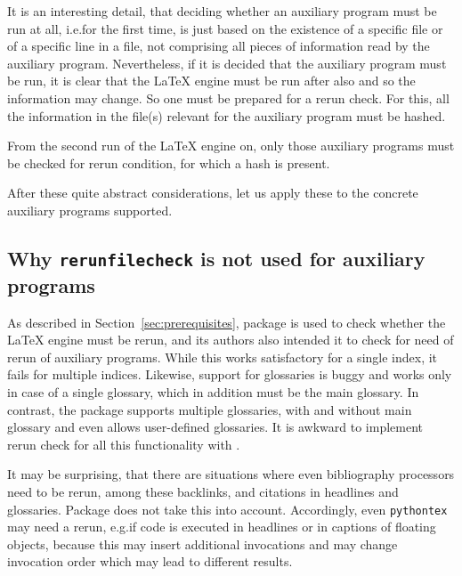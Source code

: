 It is an interesting detail, 
that deciding whether an auxiliary program must be run at all, 
i.e.\@ for the first time, 
is just based on the existence of a specific file 
or of a specific line in a file, 
not comprising all pieces of information read by the auxiliary program. 
Nevertheless, if it is decided that the auxiliary program must be run, 
it is clear that the \LaTeX{} engine must be run after also 
and so the information may change. 
So one must be prepared for a rerun check. 
For this, all the information in the file(s) %
relevant for the auxiliary program must be hashed. 

From the second run of the \LaTeX{} engine on, 
only those auxiliary programs must be checked for rerun condition, 
for which a hash is present. 
\medskip

After these quite abstract considerations, 
let us apply these to the concrete auxiliary programs supported. 





\subsection{Why \texttt{rerunfilecheck} is not used for auxiliary programs}%
\label{subsec:noRerunfilecheck}

As described in Section~\ref{sec:prerequisites}, 
package  is used to check 
whether the \LaTeX{} engine must be rerun, 
and its authors also intended it to check 
for need of rerun of auxiliary programs. 
While this works satisfactory for a single index, 
it fails for multiple indices. 
Likewise, support for glossaries is buggy and works only in case of a single glossary, 
which in addition must be the main glossary. 
In contrast, the package  supports multiple glossaries, 
with and without main glossary 
and even allows user-defined glossaries. 
It is awkward to implement rerun check 
for all this functionality with . 

It may be surprising, that there are situations 
where even bibliography processors need to be rerun, 
among these backlinks, and citations in headlines and glossaries. 
Package  does not take this into account. 
Accordingly, even \texttt{pythontex} may need a rerun, 
e.g.\@ if code is executed in headlines or in captions of floating objects, 
because this may insert additional invocations and may change invocation order 
which may lead to different results. 

